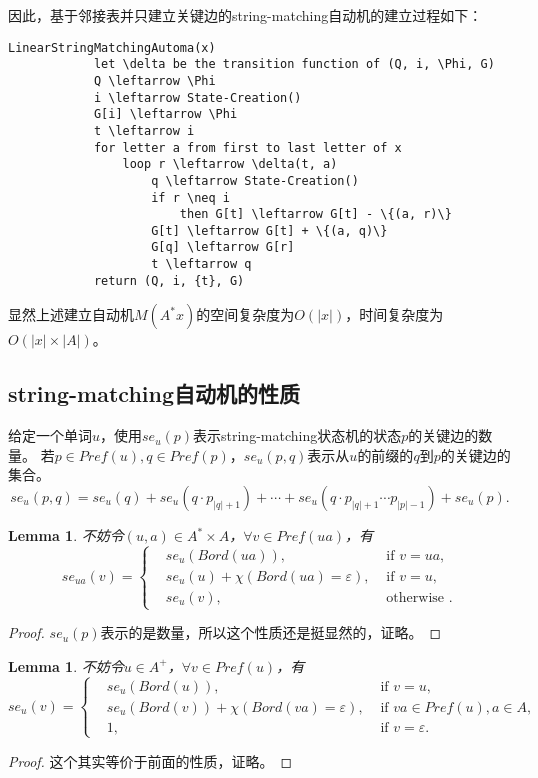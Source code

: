 \documentclass[UTF8]{ctexart}
\newtheorem{lem}[thm]{Lemma}
\theoremstyle{definition}
\theoremstyle{remark}
\numberwithin{equation}{subsection}
\begin{document}
	因此，基于邻接表并只建立关键边的string-matching自动机的建立过程如下：
	\begin{lstlisting}[frame=shadowbox,framexleftmargin=5mm,rulesepcolor=\color{gray},numbers=none]
		LinearStringMatchingAutoma(x)
			let \delta be the transition function of (Q, i, \Phi, G)
			Q \leftarrow \Phi
			i \leftarrow State-Creation()
			G[i] \leftarrow \Phi
			t \leftarrow i
			for letter a from first to last letter of x
				loop r \leftarrow \delta(t, a)
					q \leftarrow State-Creation()
					if r \neq i
						then G[t] \leftarrow G[t] - \{(a, r)\}
					G[t] \leftarrow G[t] + \{(a, q)\}
					G[q] \leftarrow G[r]
					t \leftarrow q
			return (Q, i, {t}, G)
	\end{lstlisting}
	
	显然上述建立自动机$M(A^*x)$的空间复杂度为$O(|x|)$，时间复杂度为$O(|x| \times |A|)$。
	
\subsection{string-matching自动机的性质}

	给定一个单词$u$，使用$se_u(p)$表示string-matching状态机的状态$p$的关键边的数量。
	若$p \in Pref(u), q \in Pref(p)$，$se_u(p,q)$表示从$u$的前缀的$q$到$p$的关键边的集合。
	\[
		se_u(p,q) = se_u(q) + se_u(q \cdot p_{|q|+1}) + \cdots + se_u(q \cdot p_{|q|+1} \cdots p_{|p|-1}) + se_u(p).
	\]
	\begin{lem}
		不妨令$(u,a) \in A^* \times A$，$\forall v \in Pref(ua)$，有
		\[
			se_{ua}(v) =
			\left\{
				\begin{aligned}
					&se_u(Bord(ua)),	&\text{ if } v = ua,	\\
					&se_u(u) + \chi(Bord(ua) = \varepsilon),	&\text{ if } v = u,	\\
					&se_u(v),			&\text{ otherwise }.
				\end{aligned}
			\right .
		\]
	\end{lem}
	\begin{proof}
		$se_u(p)$表示的是数量，所以这个性质还是挺显然的，证略。
	\end{proof}
	
	\begin{lem}
		不妨令$u \in A^+$，$\forall v \in Pref(u)$，有
		\[
			se_u(v) =
			\left\{
				\begin{aligned}
					&se_u(Bord(u)),		&\text{ if } v = u, \\
					&se_u(Bord(v)) + \chi(Bord(va) = \varepsilon),	&\text{ if } va \in Pref(u), a \in A,	\\
					&1,					&\text{ if } v = \varepsilon.
				\end{aligned}
			\right .
		\]
	\end{lem}
	\begin{proof}
		这个其实等价于前面的性质，证略。
	\end{proof}
	
\end{document}
